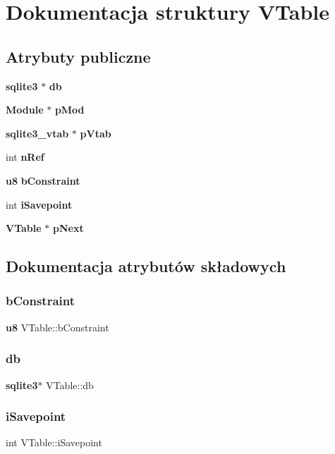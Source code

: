 \section{Dokumentacja struktury V\+Table}
\label{struct_v_table}
\subsection*{Atrybuty publiczne}
\begin{DoxyCompactItemize}
\item 
\textbf{ sqlite3} $\ast$ \textbf{ db}
\item 
\textbf{ Module} $\ast$ \textbf{ p\+Mod}
\item 
\textbf{ sqlite3\+\_\+vtab} $\ast$ \textbf{ p\+Vtab}
\item 
int \textbf{ n\+Ref}
\item 
\textbf{ u8} \textbf{ b\+Constraint}
\item 
int \textbf{ i\+Savepoint}
\item 
\textbf{ V\+Table} $\ast$ \textbf{ p\+Next}
\end{DoxyCompactItemize}


\subsection{Dokumentacja atrybutów składowych}
\mbox{\label{struct_v_table_a5a970416a76dbe3be500c9458c89550d}} 
\subsubsection{bConstraint}
{\footnotesize\ttfamily \textbf{ u8} V\+Table\+::b\+Constraint}

\mbox{\label{struct_v_table_a855b43c118d693910e9060cc9d9ac91a}} 
\subsubsection{db}
{\footnotesize\ttfamily \textbf{ sqlite3}$\ast$ V\+Table\+::db}

\mbox{\label{struct_v_table_a19f1c6c5f5fedabba7e605bbe15358e4}} 
\subsubsection{iSavepoint}
{\footnotesize\ttfamily int V\+Table\+::i\+Savepoint}

